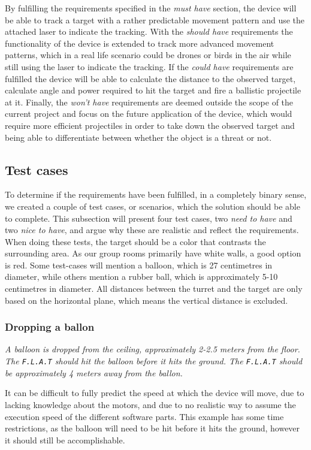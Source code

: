By fulfilling the requirements specified in the \textit{must have} section, the device will be able to track a target with a rather predictable movement pattern and use the attached laser to indicate the tracking. 
With the \textit{should have} requirements the functionality of the device is extended to track more advanced movement patterns, which in a real life scenario could be drones or birds in the air while still using the laser to indicate the tracking.
If the \textit{could have} requirements are fulfilled the device will be able to calculate the distance to the observed target, calculate angle and power required to hit the target and fire a ballistic projectile at it.
Finally, the \textit{won't have} requirements are deemed outside the scope of the current project and focus on the future application of the device, which would require more efficient projectiles in order to take down the observed target and being able to differentiate between whether the object is a threat or not.

\subsection{Test cases}
To determine if the requirements have been fulfilled, in a completely binary sense, we created a couple of test cases, or scenarios, which the solution should be able to complete. 
This subsection will present four test cases, two \textit{need to have} and two \textit{nice to have}, and argue why these are realistic and reflect the requirements.
When doing these tests, the target should be a color that contrasts the surrounding area.
As our group rooms primarily have white walls, a good option is red.
Some test-cases will mention a balloon, which is 27 centimetres in diameter, while others mention a rubber ball, which is approximately 5-10 centimetres in diameter.
All distances between the turret and the target are only based on the horizontal plane, which means the vertical distance is excluded.

\subsubsection{Dropping a ballon}
\textit{A balloon is dropped from the ceiling, approximately 2-2.5 meters from the floor.	
The \texttt{F.L.A.T} should hit the balloon before it hits the ground.
The \texttt{F.L.A.T} should be approximately 4 meters away from the ballon.}

It can be difficult to fully predict the speed at which the device will move, due to lacking knowledge about the motors, and due to no realistic way to assume the execution speed of the different software parts.
This example has some time restrictions, as the balloon will need to be hit before it hits the ground, however it should still be accomplishable.

